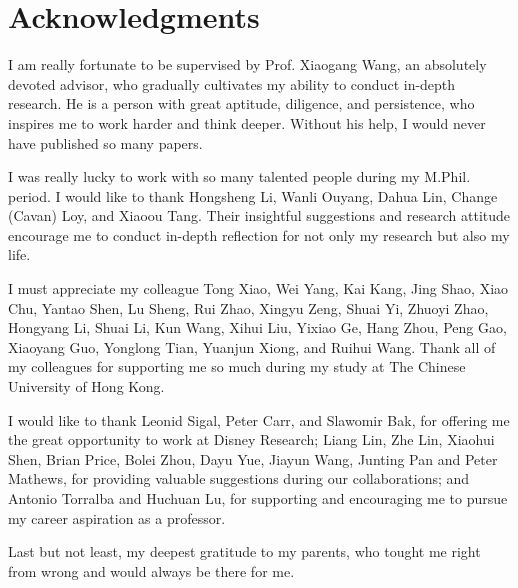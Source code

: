 \chapter*{Acknowledgments}

I am really fortunate to be supervised by Prof. Xiaogang Wang, an absolutely devoted advisor, who gradually cultivates my ability to conduct in-depth research. He is a person with great aptitude, diligence, and persistence, who inspires me to work harder and think deeper. Without his help, I would never have published so many papers.

I was really lucky to work with so many talented people during my M.Phil. period. I would like to thank Hongsheng Li, Wanli Ouyang, Dahua Lin, Change (Cavan) Loy, and Xiaoou Tang. Their insightful suggestions and research attitude encourage me to conduct in-depth reflection for not only my research but also my life.

I must appreciate my colleague Tong Xiao, Wei Yang, Kai Kang, Jing Shao, Xiao Chu, Yantao Shen, Lu Sheng, Rui Zhao, Xingyu Zeng, Shuai Yi, Zhuoyi Zhao, Hongyang Li, Shuai Li, Kun Wang, Xihui Liu, Yixiao Ge, Hang Zhou, Peng Gao, Xiaoyang Guo, Yonglong Tian, Yuanjun Xiong, and Ruihui Wang. Thank all of my colleagues for supporting me so much during my study at The Chinese University of Hong Kong.

I would like to thank Leonid Sigal, Peter Carr, and Slawomir Bak, for offering me the great opportunity to work at Disney Research; Liang Lin, Zhe Lin, Xiaohui Shen, Brian Price, Bolei Zhou, Dayu Yue, Jiayun Wang, Junting Pan and Peter Mathews, for providing valuable suggestions during our collaborations; and Antonio Torralba and Huchuan Lu, for supporting and encouraging me to pursue my career aspiration as a professor.

Last but not least, my deepest gratitude to my parents, who tought me right from wrong and would always be there for me.